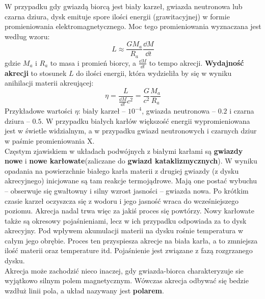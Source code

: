 \documentclass[../index.tex]{subfiles}
\begin{document}
            W przypadku gdy gwiazdą biorcą jest biały karzeł, gwiazda neutronowa lub czarna dziura, dysk emituje spore ilości energii (grawitacyjnej) w formie promieniowania elektromagnetycznego. Moc tego promieniowania wyznaczana jest według wzoru:
            \begin{equation}
                L \approx \frac{GM_a}{R_a} \frac{\dd M}{\dd t}
            \end{equation}
            gdzie \(M_a\) i \(R_a\) to masa i promień biorcy, a \(\frac{\dd M}{\dd t} \) to tempo akrecji. \textbf{Wydajność akrecji} to stosunek \(L\) do ilości energii, która wydzieliła by się w wyniku anihilacji materii akreującej:
            \begin{equation}
                \eta = \frac{L}{\frac{\dd M}{\dd t} c^2  } = \frac{G}{c^2 }\frac{M_a}{R_a} 
            \end{equation}
            Przykładowe wartości \(\eta\): biały karzeł – \(10^{ - 4}\), gwiazda neutronowa – \(0.2\) i czarna dziura – \(0.5\). W przypadku białych karłów większość energii wypromieniowana jest w świetle widzialnym, a w przypadku gwiazd neutronowych i czarnych dziur w paśmie promieniowania X. \\
            Częstym zjawiskiem w układach podwójnych z białymi karłami są \textbf{gwiazdy nowe} i \textbf{nowe karłowate}(zaliczane do \textbf{gwiazd kataklizmycznych}). W wyniku opadania na powierzchnie białego karła materii z drugiej gwiazdy (z dysku akrecyjnego) inicjowane są tam reakcje termojądrowe. Mają one postać wybuchu – obserwuje się gwałtowny i silny wzrost jasności – gwiazda nowa. Po krótkim czasie karzeł oczyszcza się z wodoru i jego jasność wraca do wcześniejszego poziomu. Akrecja nadal trwa więc za jakiś proces się powtórzy. Nowy karłowate także są okresowy pojaśnieniami, lecz w ich przypadku odpowiada za to dysk akrecyjny. Pod wpływem akumulacji materii na dysku rośnie temperatura w całym jego obrębie. Proces ten przyspiesza akrecje na biała karła, a to zmniejsza ilość materii oraz temperature itd. Pojaśnienie jest związane z fazą rozgrzanego dysku.\\
            Akrecja może zachodzić nieco inaczej, gdy gwiazda-biorca charakteryzuje sie wyjątkowo silnym polem magnetycznym. Wówczas akrecja odbywać się bedzie wzdłuż linii pola, a układ nazywany jest \textbf{polarem}.
\end{document}

